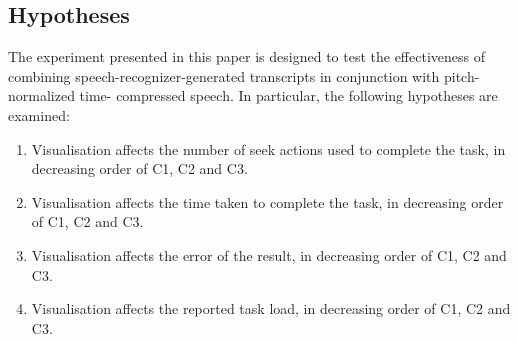 





\subsection{Hypotheses}

The experiment presented in this paper is designed to test the effectiveness of combining speech-recognizer-generated
transcripts in conjunction with pitch-normalized time- compressed speech. In particular, the following hypotheses are
examined:

\newcommand{\subscript}[2]{$#1 _ #2$}
\begin{enumerate}[label=H\arabic*.]
    \item Visualisation affects the number of seek actions used to complete the task, in decreasing order of C1, C2 and C3.
    \item Visualisation affects the time taken to complete the task, in decreasing order of C1, C2 and C3.
    \item Visualisation affects the error of the result, in decreasing order of C1, C2 and C3.
    \item Visualisation affects the reported task load, in decreasing order of C1, C2 and C3.
\end{enumerate}

